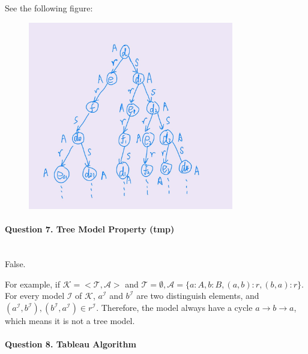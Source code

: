 \documentclass[12pt]{article}
\begin{document}
    See the following figure:\par
    \begin{figure}[htbp]
        \centering
        \includegraphics[width=0.8\textwidth,height=0.4\textwidth]{hw2_6.jpg}
    \end{figure}

    \paragraph{Question 7. Tree Model Property (tmp)}~{}
    \\

    False. \par
    For example, if $\mathcal{K} = <\mathcal{T},\mathcal{A}>$ and $\mathcal{T} = \emptyset, \mathcal{A} = \{ a:A, b:B,(a,b):r,(b,a):r\}$. For every model  $\mathcal{I}$ of $\mathcal{K}$, $a^\mathcal{I}$ and $b^\mathcal{I}$ are two distinguish elements, and $(a^\mathcal{I},b^\mathcal{I}), (b^\mathcal{I},a^\mathcal{I})\in r^\mathcal{I}$. Therefore, the model always have a cycle $a\rightarrow b\rightarrow a$, which means it is not a tree model.\par
    \paragraph{Question 8. Tableau Algorithm}~{}
    \\
\end{document}
